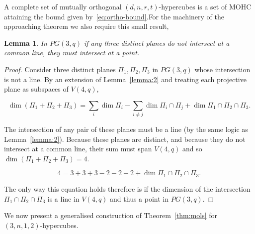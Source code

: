 \documentclass{article}
\newtheorem{lemma}{Lemma}
\begin{document}
    A complete set of mutually orthogonal \((d,n,r,t)\)-hypercubes is a set of MOHC attaining the bound given by~\eqref{eq:ortho-bound}.For the machinery of the approaching theorem we also require this small result, 

    \begin{lemma}\label{lemma:3}
        In \(PG(3, q)\) if any three distinct planes do not intersect at a common line, they must intersect at a point. 
    \end{lemma}
    \begin{proof}
        Consider three distinct planes \(\Pi_1, \Pi_2, \Pi_3\) in \(PG(3, q)\) whose intersection is not a line. By an extension of Lemma~\ref{lemma:2} and treating each projective plane as subspaces of \(V(4, q)\),
        
        \begin{equation*}
            \dim (\Pi_1 + \Pi_2 + \Pi_3) = \sum_{i} \dim \Pi_i - \sum_{i \neq j} \dim \Pi_i \cap \Pi_j + \dim \Pi_1 \cap \Pi_2 \cap \Pi_3.
        \end{equation*}

        The intersection of any pair of these planes must be a line (by the same logic as Lemma~\ref{lemma:2}). Because these planes are distinct, and because they do not intersect at a common line, their sum must span \(V(4, q)\) and so \(\dim (\Pi_1 + \Pi_2 + \Pi_3) = 4\).

        \begin{equation*}
            4 = 3 + 3 + 3 - 2 - 2 - 2 + \dim \Pi_1 \cap \Pi_2 \cap \Pi_3.
        \end{equation*}

        The only way this equation holds therefore is if the dimension of the intersection \(\Pi_1 \cap \Pi_2 \cap \Pi_3\) is a line in \(V(4, q)\) and thus a point in \(PG(3, q)\).
    \end{proof}

    We now present a generalised construction of Theorem~\ref{thm:mols} for \((3, n, 1, 2)\)-hypercubes.
\end{document}
